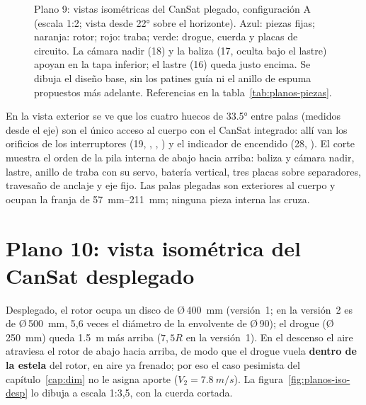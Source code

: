 \begin{figure}[p]
\begin{subfigure}[b]{0.45\textwidth}
\end{subfigure}
\caption{Plano 9: vistas isométricas del CanSat plegado, configuración A (escala 1:2;
vista desde \ang{22} sobre el horizonte). Azul: piezas fijas; naranja: rotor; rojo: traba;
verde: drogue, cuerda y placas de circuito. La cámara nadir (18) y la baliza (17, oculta
bajo el lastre) apoyan en la tapa inferior; el lastre (16) queda justo encima. Se dibuja el
diseño base, sin los patines guía ni el anillo de espuma propuestos más adelante.
Referencias en la tabla~\ref{tab:planos-piezas}.}
\label{fig:planos-iso-plegado}
\end{figure}

En la vista exterior se ve que los cuatro huecos de \ang{33.5} entre palas (medidos
desde el eje) son el único acceso al cuerpo con el CanSat integrado: allí van los orificios
de los interruptores (19, , , ) y el indicador de encendido (28,
). El corte muestra el orden de la pila interna de abajo hacia arriba: baliza y
cámara nadir, lastre, anillo de traba con su servo, batería vertical, tres placas sobre
separadores, travesaño de anclaje y eje fijo. Las palas plegadas son exteriores al
cuerpo y ocupan la franja de \SIrange{57}{211}{mm}; ninguna pieza interna las cruza.

\section{Plano 10: vista isométrica del CanSat desplegado}\label{sec:planos-iso-desp}

Desplegado, el rotor ocupa un disco de Ø\,\SI{400}{mm} (versión~1; en la versión~2 es de
Ø\,\SI{500}{mm}, 5,6 veces el diámetro de la envolvente de Ø\,90); el drogue (Ø\,\SI{250}{mm}) queda \SI{1.5}{m} más arriba ($7{,}5R$ en la versión~1). En el
descenso el aire atraviesa el rotor de abajo hacia arriba, de modo que el drogue vuela
\textbf{dentro de la estela} del rotor, en aire ya frenado; por eso el caso pesimista
del capítulo~\ref{cap:dim} no le asigna aporte ($V_2=\SI{7.8}{m/s}$). La
figura~\ref{fig:planos-iso-desp} lo dibuja a escala 1:3,5, con la cuerda cortada.

\newcommand{\plPala}[2]{%
  \pgfmathsetmacro{\pca}{cos(#1)}\pgfmathsetmacro{\psa}{sin(#1)}%
  \def\plZ##1##2{213+(##1-45.2)*0.0769-(##2)*0.0524}%
  \filldraw[fill=#2!25!white, draw=#2!80!black, line width=0.35pt]
    ({46*\pca+22.5*\psa},{46*\psa-22.5*\pca},{\plZ{46}{-22.5}}) --
    ({200*\pca+22.5*\psa},{200*\psa-22.5*\pca},{\plZ{200}{-22.5}}) --
    ({200*\pca-22.5*\psa},{200*\psa+22.5*\pca},{\plZ{200}{22.5}}) --
    ({46*\pca-22.5*\psa},{46*\psa+22.5*\pca},{\plZ{46}{22.5}}) -- cycle;
  \fill[#2!45!white]
    ({46*\pca+22.5*\psa},{46*\psa-22.5*\pca},{\plZ{46}{-22.5}}) --
    ({66*\pca+22.5*\psa},{66*\psa-22.5*\pca},{\plZ{66}{-22.5}}) --
    ({66*\pca-22.5*\psa},{66*\psa+22.5*\pca},{\plZ{66}{22.5}}) --
    ({46*\pca-22.5*\psa},{46*\psa+22.5*\pca},{\plZ{46}{22.5}}) -- cycle;
  \draw[#2, line width=1.3pt]
    ({46*\pca-22.5*\psa},{46*\psa+22.5*\pca},{\plZ{46}{22.5}}) --
    ({200*\pca-22.5*\psa},{200*\psa+22.5*\pca},{\plZ{200}{22.5}});}

